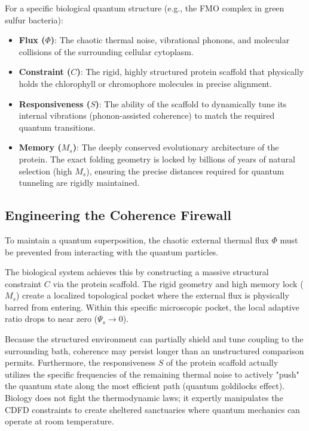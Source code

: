 \documentclass[11pt,a4paper]{article}
\begin{document}
For a specific biological quantum structure (e.g., the FMO complex in green sulfur bacteria):
\begin{itemize}
    \item \textbf{Flux ($\Phi$)}: The chaotic thermal noise, vibrational phonons, and molecular collisions of the surrounding cellular cytoplasm.
    \item \textbf{Constraint ($C$)}: The rigid, highly structured protein scaffold that physically holds the chlorophyll or chromophore molecules in precise alignment.
    \item \textbf{Responsiveness ($S$)}: The ability of the scaffold to dynamically tune its internal vibrations (phonon-assisted coherence) to match the required quantum transitions.
    \item \textbf{Memory ($M_s$)}: The deeply conserved evolutionary architecture of the protein. The exact folding geometry is locked by billions of years of natural selection (high $M_s$), ensuring the precise distances required for quantum tunneling are rigidly maintained.
\end{itemize}

\subsection{Engineering the Coherence Firewall}
To maintain a quantum superposition, the chaotic external thermal flux $\Phi$ must be prevented from interacting with the quantum particles.

The biological system achieves this by constructing a massive structural constraint $C$ via the protein scaffold. The rigid geometry and high memory lock ($M_s$) create a localized topological pocket where the external flux is physically barred from entering. Within this specific microscopic pocket, the local adaptive ratio drops to near zero ($\Psi_s \to 0$).

Because the structured environment can partially shield and tune coupling to the surrounding bath, coherence may persist longer than an unstructured comparison permits. Furthermore, the responsiveness $S$ of the protein scaffold actually utilizes the specific frequencies of the remaining thermal noise to actively "push" the quantum state along the most efficient path (quantum goldilocks effect). Biology does not fight the thermodynamic laws; it expertly manipulates the CDFD constraints to create sheltered sanctuaries where quantum mechanics can operate at room temperature.
\end{document}
